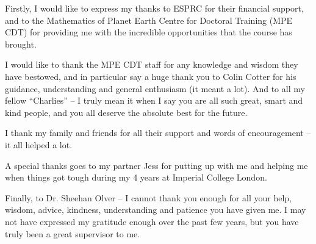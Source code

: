 
\cleardoublepage


\begin{acknowledgements}

Firstly, I would like to express my thanks to ESPRC for their financial support, and to the Mathematics of Planet Earth Centre for Doctoral Training (MPE CDT) for providing me with the incredible opportunities that the course has brought. 

I would like to thank the MPE CDT staff for any knowledge and wisdom they have bestowed, and in particular say a huge thank you to Colin Cotter for his guidance, understanding and general enthusiasm (it meant a lot). And to all my fellow \enquote{Charlies} -- I truly mean it when I say you are all such great, smart and kind people, and you all deserve the absolute best for the future.

I thank my family and friends for all their support and words of encouragement -- it all helped a lot.

A special thanks goes to my partner Jess for putting up with me and helping me when things got tough during my 4 years at Imperial College London. 

Finally, to Dr. Sheehan Olver -- I cannot thank you enough for all your help, wisdom, advice, kindness, understanding and patience you have given me. I may not have expressed my gratitude enough over the past few years, but you have truly been a great supervisor to me.


%

\end{acknowledgements}
